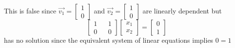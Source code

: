 \documentclass[12pt, letterpaper]{article}
\theoremstyle{statement}
\begin{document}
    This is false since $\vec{v_1} = \begin{bmatrix} 1 \\ 0 \end{bmatrix}$ and $\vec{v_2} = \begin{bmatrix} 1 \\ 0  \end{bmatrix}$ are linearly dependent but $$\begin{bmatrix} 1 && 1 \\ 0 && 0 \end{bmatrix} \begin{bmatrix} x_1 \\ x_2\end{bmatrix} = \begin{bmatrix} 0\\1 \end{bmatrix}$$ has no solution since the equivalent system of linear equations implies $0 = 1$
    
\end{document}
